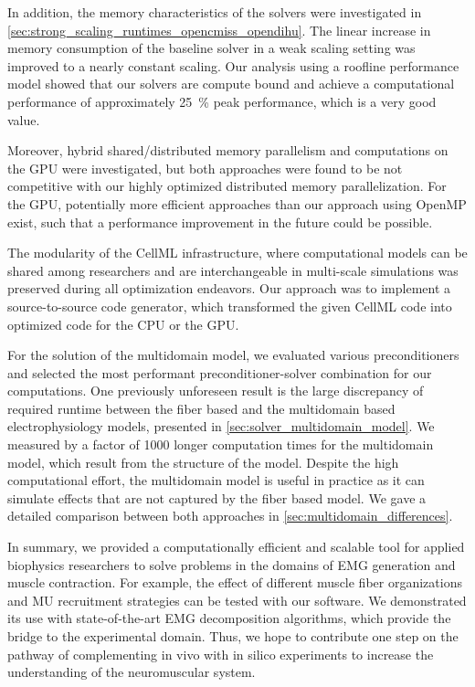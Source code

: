 In addition, the memory characteristics of the solvers were investigated in \cref{sec:strong_scaling_runtimes_opencmiss_opendihu}. 
The linear increase in memory consumption of the baseline solver in a weak scaling setting was improved to a nearly constant scaling. Our analysis using a roofline performance model showed that our solvers are compute bound and achieve a computational performance of approximately \SI{25}{\percent} peak performance, which is a very good value.

Moreover, hybrid shared/distributed memory parallelism and computations on the GPU were investigated, but both approaches were found to be not competitive with our highly optimized distributed memory parallelization. For the GPU, potentially more efficient approaches than our approach using OpenMP exist, such that a performance improvement in the future could be possible.

The modularity of the CellML infrastructure, where computational models can be shared among researchers and are interchangeable in multi-scale simulations was preserved during all optimization endeavors. Our approach was to implement a source-to-source code generator, which transformed the given CellML code into optimized code for the CPU or the GPU.

For the solution of the multidomain model, we evaluated various preconditioners and selected the most performant preconditioner-solver combination for our computations.
One previously unforeseen result is the large discrepancy of required runtime between the fiber based and the multidomain based electrophysiology models, presented in \cref{sec:solver_multidomain_model}. We measured by a factor of 1000 longer computation times for the multidomain model, which result from the structure of the model. Despite the high computational effort, the multidomain model is useful in practice as it can simulate effects that are not captured by the fiber based model. We gave a detailed comparison between both approaches in \cref{sec:multidomain_differences}.

In summary, we provided a computationally efficient and scalable tool for applied biophysics researchers to solve problems in the domains of EMG generation and muscle contraction. For example, the effect of different muscle fiber organizations and MU recruitment strategies can be tested with our software. We demonstrated its use with state-of-the-art EMG decomposition algorithms, which provide the bridge to the experimental domain.
Thus, we hope to contribute one step on the pathway of complementing in vivo with in silico experiments to increase the understanding of the neuromuscular system.

